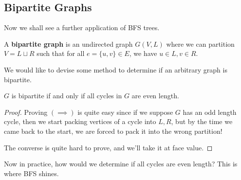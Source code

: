 \documentclass{article}
\begin{document}
  \subsection{Bipartite Graphs}

    Now we shall see a further application of BFS trees. 

    \begin{definition}
      A \textbf{bipartite graph} is an undirected graph $G(V, L)$ where we can partition $V = L \sqcup R$ such that for all $e = \{u, v\} \in E$, we have $u \in L, v \in R$.  
    \end{definition}

    We would like to devise some method to determine if an arbitrary graph is bipartite. 

    \begin{theorem}
      $G$ is bipartite if and only if all cycles in $G$ are even length. 
    \end{theorem}
    \begin{proof}
      Proving $(\implies)$ is quite easy since if we suppose $G$ has an odd length cycle, then we start packing vertices of a cycle into $L, R$, but by the time we came back to the start, we are forced to pack it into the wrong partition! 

      The converse is quite hard to prove, and we'll take it at face value. 
    \end{proof}

    Now in practice, how would we determine if all cycles are even length? This is where BFS shines. 
\end{document}
